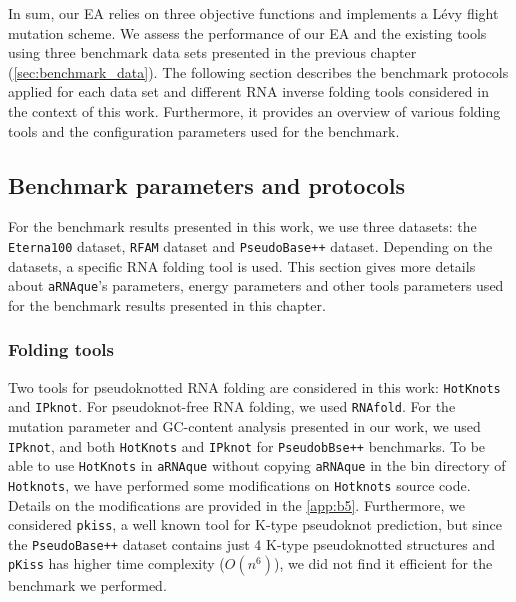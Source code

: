In sum, our \ac{EA} relies on three objective functions and implements a Lévy flight mutation scheme. We assess the performance of our \ac{EA} and the existing tools using three benchmark data sets presented in the previous chapter (\autoref{sec:benchmark_data}). The following section describes the benchmark protocols applied for each data set and different \ac{RNA} inverse folding tools considered in the context of this work. Furthermore, it provides an overview of various folding tools and the configuration parameters used for the benchmark.

\subsection{Benchmark parameters and protocols}
For the benchmark results presented in this work, we use three datasets: the \texttt{Eterna100} dataset, \texttt{RFAM} dataset and \texttt{PseudoBase++} dataset. Depending on the datasets, a specific \ac{RNA} folding tool is used. This section gives more details about \texttt{aRNAque}'s parameters, energy parameters and other tools parameters used for the benchmark results presented in this chapter. 
\subsubsection*{Folding tools}
Two tools for pseudoknotted \ac{RNA} folding are considered in this work: \texttt{HotKnots} and \texttt{IPknot}. For pseudoknot-free \ac{RNA} folding, we used \texttt{RNAfold}.
For the mutation parameter and GC-content analysis presented in our work, we used \texttt{IPknot}, and both \texttt{HotKnots} and \texttt{IPknot} for \texttt{PseudobBse++} benchmarks. To be able to use \texttt{HotKnots} in \texttt{aRNAque} without copying \texttt{aRNAque} in the bin directory of \texttt{Hotknots}, we have performed some modifications on \texttt{Hotknots} source code. Details on the modifications are provided in the \autoref{app:b5}. Furthermore, we considered \texttt{pkiss}, a well known tool for K-type pseudoknot prediction, but since the \texttt{PseudoBase++} dataset contains just $4$ K-type pseudoknotted structures and \texttt{pKiss} has higher time complexity ($O(n^6)$), we did not find it efficient for the benchmark we performed.
